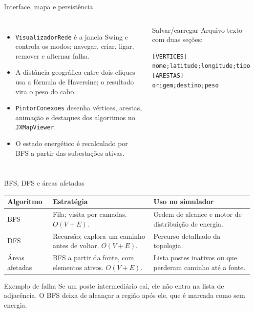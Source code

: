 \documentclass[aspectratio=169,10pt]{beamer}
\begin{document}
\begin{frame}{Interface, mapa e persistência}
\begin{columns}[T]
  \begin{itemize}
    \item \texttt{VisualizadorRede} é a janela Swing e controla os modos: navegar, criar, ligar, remover e alternar falha.
    \item A distância geográfica entre dois cliques usa a fórmula de Haversine; o resultado vira o peso do cabo.
    \item \texttt{PintorConexoes} desenha vértices, arestas, animação e destaques dos algoritmos no \texttt{JXMapViewer}.
    \item O estado energético é recalculado por BFS a partir das subestações ativas.
  \end{itemize}
  \begin{block}{Salvar/carregar}
    Arquivo texto com duas seções:
    \begin{center}
      \texttt{[VERTICES]}\\
      \texttt{nome;latitude;longitude;tipo}\\[0.15cm]
      \texttt{[ARESTAS]}\\
      \texttt{origem;destino;peso}
    \end{center}
  \end{block}
\end{columns}
\end{frame}

\begin{frame}{BFS, DFS e áreas afetadas}
\begin{tabular}{@{}p{}p{}p{}@{}}
\toprule
Algoritmo & Estratégia & Uso no simulador \\
\midrule
BFS & Fila; visita por camadas. $O(V+E)$. & Ordem de alcance e motor de distribuição de energia. \\
DFS & Recursão; explora um caminho antes de voltar. $O(V+E)$. & Percurso detalhado da topologia. \\
Áreas afetadas & BFS a partir da fonte, com elementos ativos. $O(V+E)$. & Lista postes inativos ou que perderam caminho até a fonte. \\
\bottomrule
\end{tabular}

\vspace{0.35cm}
\begin{block}{Exemplo de falha}
  Se um poste intermediário cai, ele não entra na lista de adjacência. O BFS deixa de alcançar a região após ele, que é marcada como sem energia.
\end{block}
\end{frame}
\end{document}
